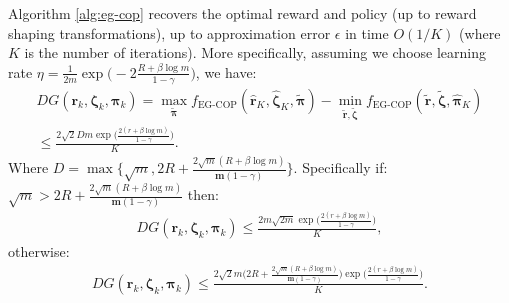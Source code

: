   \begin{theorem}
    \label{thm:EG_COP_convergence}
    Algorithm \ref{alg:eg-cop} recovers the optimal reward and policy (up to reward shaping transformations), up to approximation error $\epsilon$ in time $O(1/K)$ (where $K$ is the number of iterations). More specifically, assuming we choose learning rate $\eta = \frac{1}{2m} \exp \Big( -2 \frac{R +\beta \log m}{1-\gamma}  \Big)$, we have: 
    \begin{align*}
        DG(\bm{r}_k,\bm{\zeta}_k,\bm{\pi}_k) = \max_{\tilde{\bm{\pi}}} f_\text{EG-COP}(\hat{\bm{r}}_K,\hat{\bm{\zeta}}_K,\tilde{\bm{\pi}}) -
        \min_{\tilde{\bm{r}},\tilde{\bm{\zeta}}} f_\text{EG-COP}(\tilde{\bm{r}}, \tilde{\bm{\zeta}},\hat{\bm{\pi}}_K) \\
        \leq \frac{{2\sqrt{2} D m \exp \big(\frac{2(r+\beta \log m)}{1- \gamma})}}{K}.
    \end{align*}
    Where $D=\max\Big\{\sqrt{m},2R + \frac{2\sqrt{m}(R+ \beta \log m)}{\bm{m}(1-\gamma)} \Big\}$. Specifically if: $\sqrt{m}>2R + \frac{2\sqrt{m}(R+ \beta \log m)}{\bm{m}(1-\gamma)}$ then: 
    \begin{align*}
        DG(\bm{r}_k,\bm{\zeta}_k,\bm{\pi}_k) 
        \leq \frac{{ 2 m \sqrt{2m} \exp \big(\frac{2(r+\beta \log m)}{1- \gamma})}}{K},
    \end{align*}
    otherwise:
    \begin{align*}
        DG(\bm{r}_k, \bm{\zeta}_k,\bm{\pi}_k) 
        \leq \frac{ 2 \sqrt{2} m \Big(2R + \frac{2\sqrt{m}(R+ \beta \log m)}{\bm{m}(1-\gamma)} \Big)  \exp \big(\frac{2(r+\beta \log m)}{1- \gamma})}{K}.
    \end{align*}
  \end{theorem}
